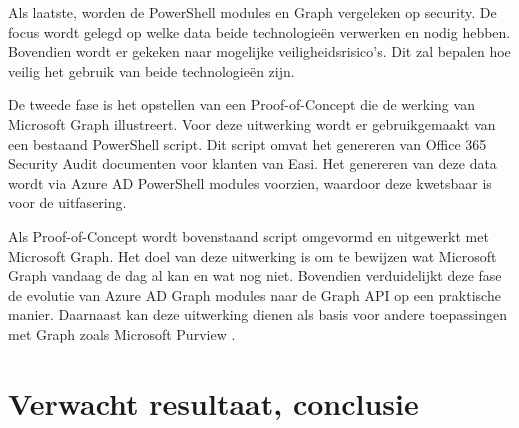 Als laatste, worden de PowerShell modules en Graph vergeleken op security. De focus wordt gelegd op welke data beide technologieën verwerken en nodig hebben. Bovendien wordt er gekeken naar mogelijke veiligheidsrisico's. Dit zal bepalen hoe veilig het gebruik van beide technologieën zijn.

De tweede fase is het opstellen van een Proof-of-Concept die de werking van Microsoft Graph illustreert. Voor deze uitwerking wordt er gebruikgemaakt van een bestaand PowerShell script. Dit script omvat het genereren van Office 365 Security Audit documenten voor klanten van Easi. Het genereren van deze data wordt via Azure AD PowerShell modules voorzien, waardoor deze kwetsbaar is voor de uitfasering. 

Als Proof-of-Concept wordt bovenstaand script omgevormd en uitgewerkt met Microsoft Graph. Het doel van deze uitwerking is om te bewijzen wat Microsoft Graph vandaag de dag al kan en wat nog niet. Bovendien verduidelijkt deze fase de evolutie van Azure AD Graph modules naar de Graph API op een praktische manier. Daarnaast kan deze uitwerking dienen als basis voor andere toepassingen met Graph zoals Microsoft Purview \autocite{Microsoft2023a}. 

\section{Verwacht resultaat, conclusie}%
\label{sec:verwachte_resultaten}

